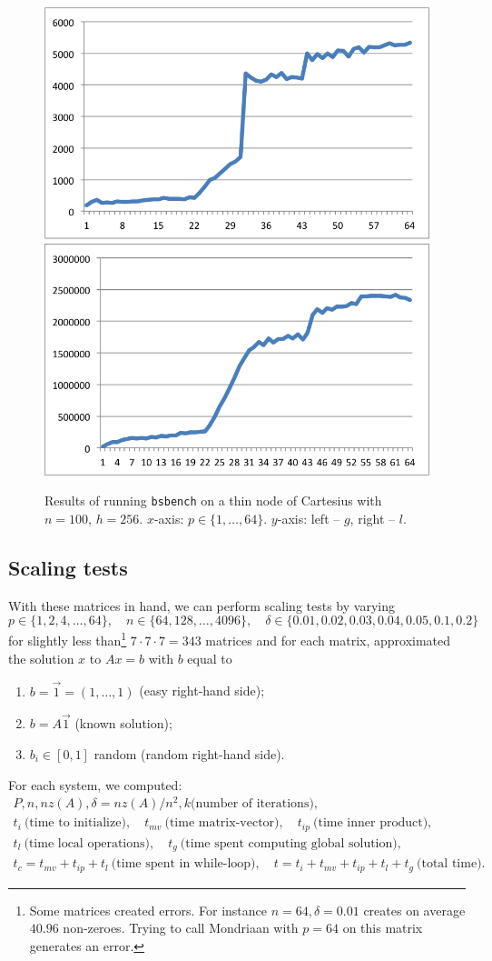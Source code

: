 \documentclass[11pt]{amsart}
\theoremstyle{definition}
\begin{document}
\begin{figure}
  \includegraphics[width=0.49\linewidth]{cartg.png}
  \includegraphics[width=0.49\linewidth]{cartl.png}
  \caption{Results of running \texttt{bsbench} on a thin node of Cartesius with $n=100$, $h=256$. $x$-axis: $p \in \{1, \ldots, 64\}$. $y$-axis: left -- $g$, right -- $l$.}
  \label{fig:cart}
\end{figure}

\subsection{Scaling tests}
\label{sec:cgres}
With these matrices in hand, we can perform scaling tests by varying 
\[ p \in \{1, 2, 4, \ldots, 64\}, \quad n \in \{64, 128, \ldots, 4096 \}, \quad \delta \in \{0.01, 0.02, 0.03, 0.04, 0.05, 0.1, 0.2\} \]
for slightly less than\footnote{Some matrices created errors. For instance $n = 64, \delta = 0.01$ creates on average $40.96$ non-zeroes. Trying to call Mondriaan with $p=64$ on this matrix generates an error.} $7 \cdot 7 \cdot 7 = 343$ matrices and for each matrix, approximated the solution $x$ to $Ax=b$ with $b$ equal to
\begin{enumerate}
  \item $b = \vec 1 = (1, \ldots, 1)$ (easy right-hand side);
  \item $b = A\vec 1$ (known solution);
  \item $b_i \in [0, 1]$ random (random right-hand side).
\end{enumerate}

For each system, we computed:
\begin{gather*} 
P, n, nz(A), \delta = nz(A)/n^2, k \text{(number of iterations)}, \\
t_i~ \text{(time to initialize)}, \quad t_{mv}~ \text{(time matrix-vector)}, \quad t_{ip}~ \text{(time inner product)}, \\
t_l~ \text{(time local operations)}, \quad t_g~ \text{(time spent computing global solution)}, \\
t_c = t_{mv} + t_{ip} + t_l~ \text{(time spent in while-loop)}, \quad t = t_i + t_{mv} + t_{ip} + t_l + t_g~ \text{(total time)}.
\end{gather*}
\end{document}
